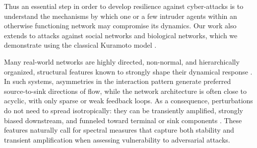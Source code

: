 \documentclass[%
 reprint,
 amsmath,amssymb,
 aip,
]{revtex4-2}
\theoremstyle{italichead}
\theoremstyle{definition}
\begin{document}
Thus an essential step in order to develop resilience against  
cyber-attacks is to understand the mechanisms by which one or a few
intruder agents within %
an otherwise functioning network may compromise its dynamics. Our work also extends to attacks against social networks and biological networks, which we demonstrate using the classical Kuramoto model \cite{KuraBOOK}.

{Many real-world networks are highly directed, non-normal, and hierarchically organized, structural features known to strongly shape their dynamical response \cite{johnson2017looplessness,Asllani2018Structure,asllani2018topological,MUOLO2019Patterns,muolo2020synchronization,o2021hierarchical,Duan2022Network,nazerian2023commphys,Ramon, nazerian2024efficiency, muolo2024persistence, nazerian2026frequency}. In such systems, asymmetries in the interaction pattern generate preferred source-to-sink directions of flow, while the network architecture is often close to acyclic, with only sparse or weak feedback loops. As a consequence, perturbations do not need to spread isotropically: they can be transiently amplified, strongly biased downstream, and funneled toward terminal or sink components \cite{o2021hierarchical,Ramon,nazerian2026frequency}. These features naturally call for spectral measures that capture both stability and transient amplification when assessing vulnerability to adversarial attacks.}
\end{document}
